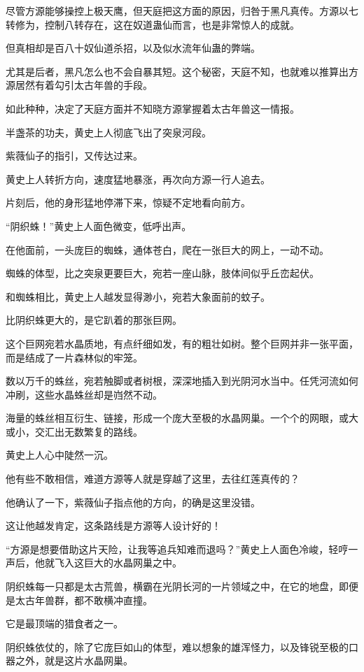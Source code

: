 \begin{this_body}
尽管方源能够操控上极天鹰，但天庭把这方面的原因，归咎于黑凡真传。方源以七转修为，控制八转存在，这在奴道蛊仙而言，也是非常惊人的成就。

但真相却是百八十奴仙道杀招，以及似水流年仙蛊的弊端。

尤其是后者，黑凡怎么也不会自暴其短。这个秘密，天庭不知，也就难以推算出方源居然有着勾引太古年兽的手段。

如此种种，决定了天庭方面并不知晓方源掌握着太古年兽这一情报。

半盏茶的功夫，黄史上人彻底飞出了突泉河段。

紫薇仙子的指引，又传达过来。

黄史上人转折方向，速度猛地暴涨，再次向方源一行人追去。

片刻后，他的身形猛地停滞下来，惊疑不定地看向前方。

“阴织蛛！”黄史上人面色微变，低呼出声。

在他面前，一头庞巨的蜘蛛，通体苍白，爬在一张巨大的网上，一动不动。

蜘蛛的体型，比之突泉更要巨大，宛若一座山脉，肢体间似乎丘峦起伏。

和蜘蛛相比，黄史上人越发显得渺小，宛若大象面前的蚊子。

比阴织蛛更大的，是它趴着的那张巨网。

这个巨网宛若水晶质地，有点纤细如发，有的粗壮如树。整个巨网并非一张平面，而是结成了一片森林似的牢笼。

数以万千的蛛丝，宛若触脚或者树根，深深地插入到光阴河水当中。任凭河流如何冲刷，这些水晶蛛丝却是岿然不动。

海量的蛛丝相互衍生、链接，形成一个庞大至极的水晶网巢。一个个的网眼，或大或小，交汇出无数繁复的路线。

黄史上人心中陡然一沉。

他有些不敢相信，难道方源等人就是穿越了这里，去往红莲真传的？

他确认了一下，紫薇仙子指点他的方向，的确是这里没错。

这让他越发肯定，这条路线是方源等人设计好的！

“方源是想要借助这片天险，让我等追兵知难而退吗？”黄史上人面色冷峻，轻哼一声后，他就飞入这巨大的水晶网巢之中。

阴织蛛每一只都是太古荒兽，横霸在光阴长河的一片领域之中，在它的地盘，即便是太古年兽群，都不敢横冲直撞。

它是最顶端的猎食者之一。

阴织蛛依仗的，除了它庞巨如山的体型，难以想象的雄浑怪力，以及锋锐至极的口器之外，就是这片水晶网巢。


\end{this_body}
